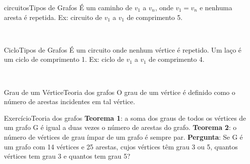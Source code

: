 \documentclass[t]{beamer}
\begin{document}

\begin{ftst}{circuitos}{Tipos de Grafos}
É um caminho de $v_1$ a $v_n$, onde $v_1 = v_n$ e nenhuma aresta é repetida.
\vone
Ex: circuito de $v_1$ a $v_1$ de comprimento 5.

\vone
\centering
\\


\end{ftst}


\begin{ftst}{Ciclo}{Tipos de Grafos}
É um circuito onde nenhum vértice é repetido.
\vone
Um laço é um ciclo de comprimento 1.
\vone
Ex: ciclo de $v_1$ a $v_1$ de comprimento 4.

\vone
\centering
\\


\end{ftst}


\begin{ftst}{Grau de um Vértice}{Teoria dos grafos}
\justifying
O grau de um vértice é definido como o número de arestas incidentes em tal vértice.
\vone
\vone
\centering
\\


\end{ftst}


\begin{ftst}{Exercício}{Teoria dos grafos}
\justifying
\textbf{Teorema 1}: a soma dos graus de todos os vértices de um grafo G é igual a duas vezes o número de arestas do grafo.
\vone
\textbf{Teorema 2}: o número de vértices de grau ímpar de um grafo é sempre par.
\vone
\textbf{Pergunta}: Se G é um grafo com 14 vértices e 25 arestas, cujos vértices têm grau 3 ou 5, quantos vértices tem grau 3 e quantos tem grau 5?



\end{ftst}

\end{document}
